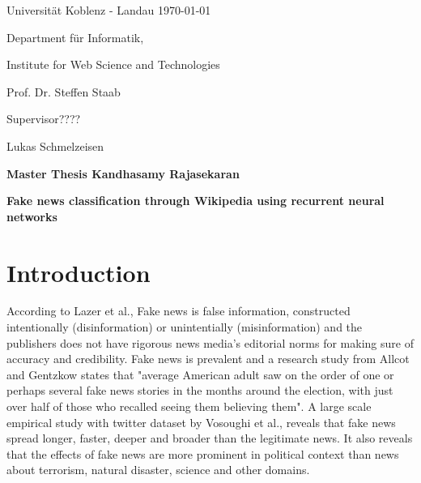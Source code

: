 \documentclass[a4paper, 11pt]{article}
\newcommand{\myName}{Kandhasamy Rajasekaran}
\newcommand{\Title}{Fake news classification through Wikipedia using recurrent neural networks}
\newcommand{\subject}{Institute for Web Science and Technologies}
\newcommand{\expert}{Prof. Dr. Steffen Staab}%
\newcommand{\supervisor}{Supervisor????} %
\newcommand{\secondSupervisor}{Lukas Schmelzeisen} %
\newcommand{\type}{Master Thesis}
\begin{document}
Universit\"{a}t Koblenz - Landau \hfill \today

Department f\"{u}r Informatik,

\subject{}

\expert{}

\supervisor{}

\secondSupervisor{}

\begin{center}
	\large{\bf \type{}  \myName{}}

	\vspace*{0.5cm}

	\large{\bf \Title}
\end{center}

\setlength{\parskip}{1.5ex plus0.5ex minus 0.5ex}
\begin{abstract}
\frenchspacing
\noindent
The unprecedented growth in production and dissemination of information leads to an unprecedented growth in production and dissemination of fake news. Fake news hinders the society from progress by delaying the pursuit of right information. It is very essential to have a mechanism to detect and control fake news. Several organizations uses collaborative efforts of domain experts, a manual process which cannot withstand the proliferation of news production and dissemination. This research work will use Wikipedia as a ground reality and cross check claims automatically. Recurrent neural networks will be used to understand Wikipedia and the performance of different configurations of Neural Networks will be benchmarked against each other and the already available automated fake news detectors.
\end{abstract}
\section{Introduction}
\frenchspacing


According to Lazer et al.\cite{Lazer1094}, Fake news is false information, constructed intentionally (disinformation) or unintentially (misinformation) and the publishers does not have rigorous news media's editorial norms for making sure of accuracy and credibility. Fake news is prevalent and a research study from Allcot and Gentzkow \cite{Allcott2017} states that "average American adult saw on the order of one or perhaps several fake news stories in the months around the election, with just over half of those who recalled seeing them believing them". A large scale empirical study with twitter dataset by Vosoughi et al.\cite{Vosoughi1146}, reveals that fake news spread longer, faster, deeper and broader than the legitimate news. It also reveals that the effects of fake news are more prominent in political context than news about terrorism, natural disaster, science and other domains.
\end{document}
